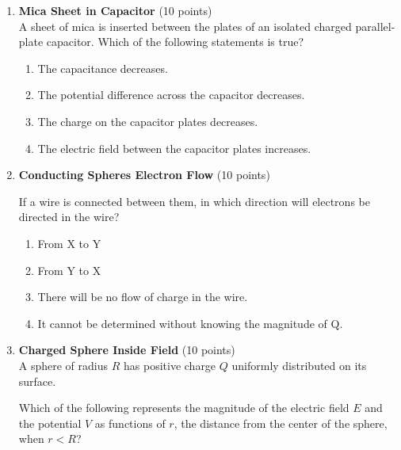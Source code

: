 \begin{enumerate}
  \item \textbf{Mica Sheet in Capacitor} (10 points)\\
  A sheet of mica is inserted between the plates of an isolated charged parallel-plate capacitor. Which of the following statements is true?
  \begin{enumerate}[label=(\Alph*)]
    \item The capacitance decreases.
    \item The potential difference across the capacitor decreases.
    \item The charge on the capacitor plates decreases.
    \item The electric field between the capacitor plates increases.
  \end{enumerate}
  \begin{subanswer}
  \end{subanswer}

  \item \textbf{Conducting Spheres Electron Flow} (10 points)\\
  
  If a wire is connected between them, in which direction will electrons be directed in the wire?
  \begin{enumerate}[label=(\Alph*)]
    \item From X to Y
    \item From Y to X
    \item There will be no flow of charge in the wire.
    \item It cannot be determined without knowing the magnitude of Q.
  \end{enumerate}
  \begin{subanswer}
  \end{subanswer}

  \item \textbf{Charged Sphere Inside Field} (10 points)\\
  A sphere of radius $R$ has positive charge $Q$ uniformly distributed on its surface.
  
  Which of the following represents the magnitude of the electric field $E$ and the potential $V$ as functions of $r$, the distance from the center of the sphere, when $r < R$?
  

\end{enumerate}
